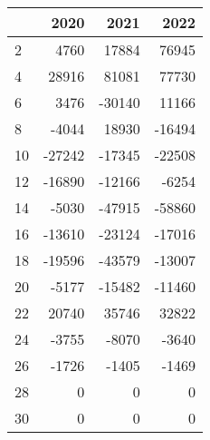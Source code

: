 \begin{tabular}{lrrr}
\toprule
{} &   2020 &   2021 &   2022 \\
\midrule
2  &   4760 &  17884 &  76945 \\
4  &  28916 &  81081 &  77730 \\
6  &   3476 & -30140 &  11166 \\
8  &  -4044 &  18930 & -16494 \\
10 & -27242 & -17345 & -22508 \\
12 & -16890 & -12166 &  -6254 \\
14 &  -5030 & -47915 & -58860 \\
16 & -13610 & -23124 & -17016 \\
18 & -19596 & -43579 & -13007 \\
20 &  -5177 & -15482 & -11460 \\
22 &  20740 &  35746 &  32822 \\
24 &  -3755 &  -8070 &  -3640 \\
26 &  -1726 &  -1405 &  -1469 \\
28 &      0 &      0 &      0 \\
30 &      0 &      0 &      0 \\
\bottomrule
\end{tabular}
